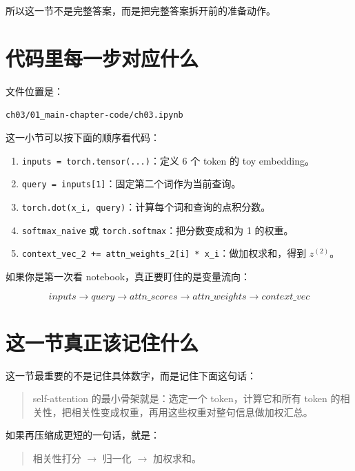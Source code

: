 \documentclass[12pt,a4paper]{ctexart}
\begin{document}
所以这一节不是完整答案，而是把完整答案拆开前的准备动作。

\section{代码里每一步对应什么}

文件位置是：

\begin{center}
\texttt{ch03/01\_main-chapter-code/ch03.ipynb}
\end{center}

这一小节可以按下面的顺序看代码：

\begin{enumerate}[leftmargin=2em]
  \item \texttt{inputs = torch.tensor(...)}：定义 6 个 token 的 toy embedding。
  \item \texttt{query = inputs[1]}：固定第二个词作为当前查询。
  \item \texttt{torch.dot(x\_i, query)}：计算每个词和查询的点积分数。
  \item \texttt{softmax\_naive} 或 \texttt{torch.softmax}：把分数变成和为 1 的权重。
  \item \texttt{context\_vec\_2 += attn\_weights\_2[i] * x\_i}：做加权求和，得到 \(z^{(2)}\)。
\end{enumerate}

如果你是第一次看 notebook，真正要盯住的是变量流向：

\[
inputs \rightarrow query \rightarrow attn\_scores \rightarrow attn\_weights \rightarrow context\_vec
\]

\section{这一节真正该记住什么}

这一节最重要的不是记住具体数字，而是记住下面这句话：

\begin{quote}
self-attention 的最小骨架就是：选定一个 token，计算它和所有 token 的相关性，把相关性变成权重，再用这些权重对整句信息做加权汇总。
\end{quote}

如果再压缩成更短的一句话，就是：

\begin{quote}
相关性打分 $\rightarrow$ 归一化 $\rightarrow$ 加权求和。
\end{quote}
\end{document}
